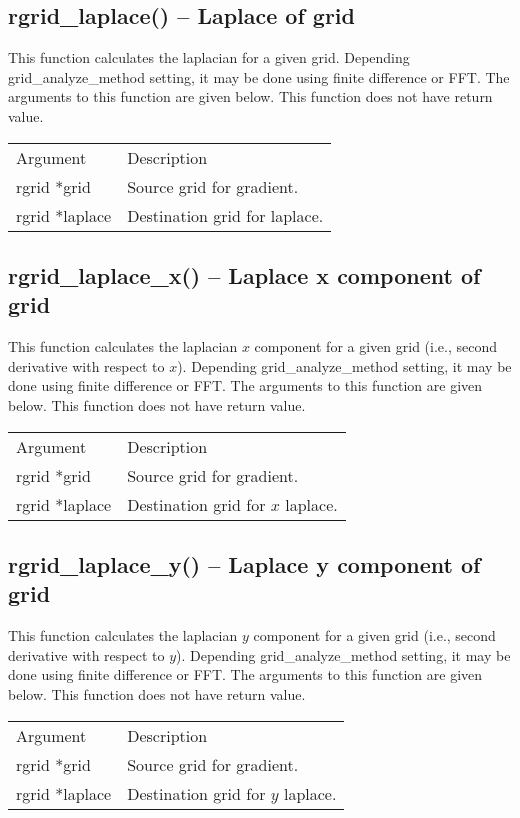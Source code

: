 \documentclass[12pt,letterpaper]{report}
\begin{document}
\subsection{rgrid\_laplace() -- Laplace of grid}

This function calculates the laplacian for a given grid. Depending grid\_analyze\_method setting, it may be done using finite difference or FFT. The arguments to this function are given below. This function does not have return value.\\
\begin{longtable}{p{} p{}}
Argument & Description\\
\cline{1-2}
rgrid *grid & Source grid for gradient.\\
rgrid *laplace & Destination grid for laplace.\\
\end{longtable}

\subsection{rgrid\_laplace\_x() -- Laplace x component of grid}

This function calculates the laplacian $x$ component for a given grid (i.e., second derivative with respect to $x$). Depending grid\_analyze\_method setting, it may be done using finite difference or FFT. The arguments to this function are given below. This function does not have return value.\\
\begin{longtable}{p{} p{}}
Argument & Description\\
\cline{1-2}
rgrid *grid & Source grid for gradient.\\
rgrid *laplace & Destination grid for $x$ laplace.\\
\end{longtable}

\subsection{rgrid\_laplace\_y() -- Laplace y component of grid}

This function calculates the laplacian $y$ component for a given grid (i.e., second derivative with respect to $y$). Depending grid\_analyze\_method setting, it may be done using finite difference or FFT. The arguments to this function are given below. This function does not have return value.\\
\begin{longtable}{p{} p{}}
Argument & Description\\
\cline{1-2}
rgrid *grid & Source grid for gradient.\\
rgrid *laplace & Destination grid for $y$ laplace.\\
\end{longtable}
\end{document}
